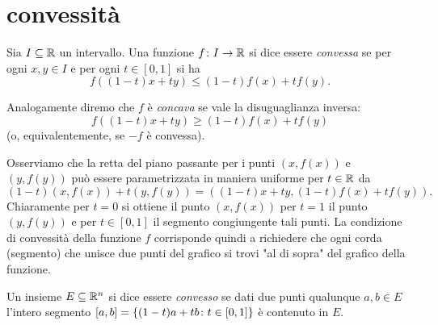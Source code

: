 \section{convessità}

\begin{definition}
\mymark{**}
Sia $I\subseteq {\mathbb R}$ un intervallo.
Una funzione $f\colon I\to {\mathbb R}$
si dice essere
\emph{convessa}
se per ogni $x,y\in I$ e per ogni $t\in [0,1]$ si ha
\[
f((1-t)x + ty) \le (1-t) f(x) + t f(y).
\]

Analogamente diremo che $f$ è \emph{concava} 
%
%
se vale la disuguaglianza inversa:
\[
f((1-t)x + ty) \ge (1-t) f(x) + t f(y)
\]
(o, equivalentemente, se $-f$ è convessa).
\end{definition}

Osserviamo che la retta del piano passante per i punti $(x,f(x))$ e $(y,f(y))$ può essere parametrizzata in maniera uniforme per $t\in {\mathbb R}$
da
\[
  (1-t) (x,f(x)) + t(y,f(y)) = ((1-t)x + ty, (1-t) f(x) + tf(y)).
\]
Chiaramente per $t=0$ si ottiene il punto $(x,f(x))$ per $t=1$ il punto $(y,f(y))$ e per $t\in[0,1]$ il segmento congiungente tali punti. La condizione di convessità della funzione $f$ corrisponde quindi a richiedere che ogni corda (segmento) che unisce due punti del grafico si trovi "al di sopra" del grafico della funzione.

\begin{definition}
\mymark{*}
Un insieme $E\subseteq {\mathbb R}^n$ si dice essere \emph{convesso}%
%
 se dati
due punti qualunque $a,b\in E$ l'intero segmento $[a,b]={\left\{ (1-t)a+tb\colon t\in [0,1] \right\}}$ è contenuto in $E$.
\end{definition}

